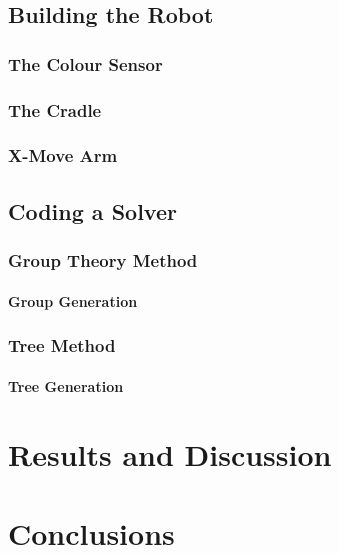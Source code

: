 \documentclass{report}
\begin{document}
    \section{Building the Robot}
    \subsection{The Colour Sensor}
    \subsection{The Cradle}
    \subsection{X-Move Arm}
    \section{Coding a Solver}
    \subsection{Group Theory Method}
    \subsubsection{Group Generation}
    \subsection{Tree Method}
    \subsubsection{Tree Generation}
    
    \newpage
    \chapter{Results and Discussion}
    
    \newpage
    \chapter{Conclusions}
    
    \begin{appendix}
    	\newpage  
    	\listoffigures
    	\listoftables
    	\newpage
    	
    	
    \end{appendix}
    
\end{document}
